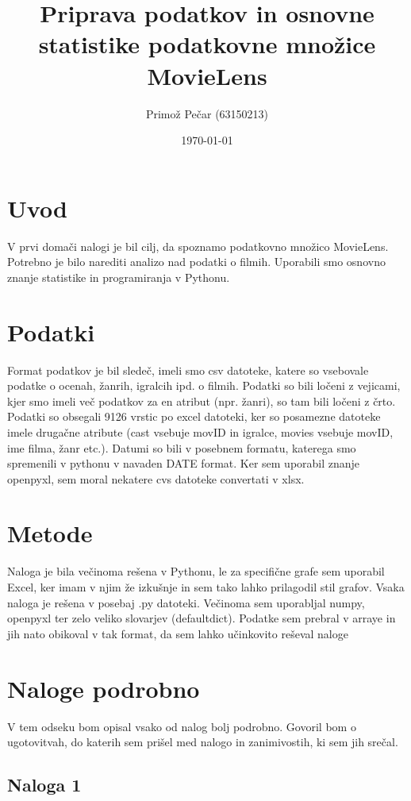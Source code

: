 \documentclass[a4paper,11pt]{article}
\title{Priprava podatkov in osnovne statistike podatkovne množice MovieLens}
\author{Primož Pečar (63150213)}
\date{\today}
\begin{document}
\maketitle

\section{Uvod}

V prvi domači nalogi je bil cilj, da spoznamo podatkovno množico MovieLens. Potrebno je bilo narediti analizo nad podatki o filmih. Uporabili smo osnovno znanje statistike in programiranja v Pythonu. 

\section{Podatki}

Format podatkov je bil sledeč, imeli smo csv datoteke, katere so vsebovale podatke o ocenah, žanrih, igralcih ipd. o filmih. Podatki so bili ločeni z vejicami, kjer smo imeli več podatkov za en atribut (npr. žanri), so tam bili ločeni z črto. Podatki so obsegali 9126 vrstic po excel datoteki, ker so posamezne datoteke imele drugačne atribute (cast vsebuje movID in igralce, movies vsebuje movID, ime filma, žanr etc.). Datumi so bili v posebnem formatu, katerega smo spremenili v pythonu v navaden DATE format. Ker sem uporabil znanje openpyxl, sem moral nekatere cvs datoteke convertati v xlsx.


\section{Metode}

Naloga je bila večinoma rešena v Pythonu, le za specifične grafe sem uporabil Excel, ker imam v njim že izkušnje in sem tako lahko prilagodil stil grafov. Vsaka naloga je rešena v posebaj .py datoteki. Večinoma sem uporabljal numpy, openpyxl ter zelo veliko slovarjev (defaultdict). Podatke sem prebral v arraye in jih nato obikoval v tak format, da sem lahko učinkovito reševal naloge


\section{Naloge podrobno}

V tem odseku bom opisal vsako od nalog bolj podrobno. Govoril bom o ugotovitvah, do katerih sem prišel med nalogo in zanimivostih, ki sem jih srečal.

\subsection{Naloga 1}
\end{document}
